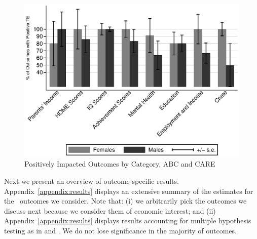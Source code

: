\begin{figure}[H]
		\caption{Positively Impacted Outcomes by Category, ABC and CARE} \label{fig:ppositivecategory1}
		\includegraphics[width=.9\columnwidth]{output/itt_noctrl_cats1.eps}
\end{figure}

\noindent Next we present an overview of outcome-specific results. Appendix~\ref{appendix:results} displays an extensive summary of the estimates for the \noutcomes\ outcomes we consider. Note that: (i) we arbitrarily pick the outcomes we discuss next because we consider them of economic interest; and (ii) Appendix~\ref{appendix:results} displays results accounting for multiple hypothesis testing as in \citet{Lehman_Romano_2005_AnnStat} and \citet{Romano_Shaikh_2006_AnnStat}. We do not lose significance in the majority of outcomes.\\


